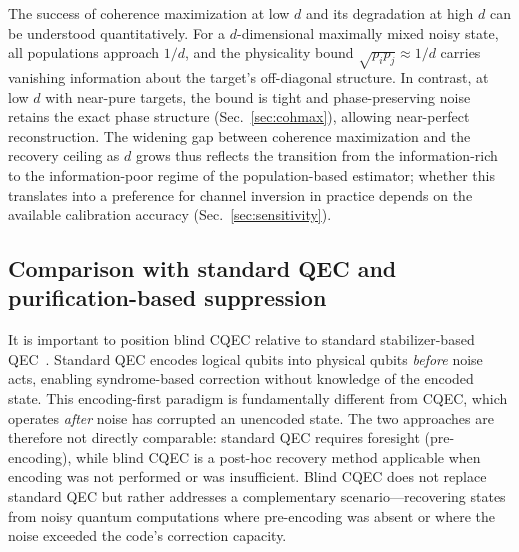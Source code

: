 \documentclass[12pt,a4paper]{article}
\begin{document}
The success of coherence maximization at low $d$ and its degradation at high $d$ can be understood quantitatively.
For a $d$-dimensional maximally mixed noisy state, all populations approach $1/d$, and the physicality bound $\sqrt{p_i p_j} \approx 1/d$ carries vanishing information about the target's off-diagonal structure.
In contrast, at low $d$ with near-pure targets, the bound is tight and phase-preserving noise retains the exact phase structure (Sec.~\ref{sec:cohmax}), allowing near-perfect reconstruction.
The widening gap between coherence maximization and the recovery ceiling as $d$ grows thus reflects the transition from the information-rich to the information-poor regime of the population-based estimator; whether this translates into a preference for channel inversion in practice depends on the available calibration accuracy (Sec.~\ref{sec:sensitivity}).


\subsection{Comparison with standard QEC and purification-based suppression}
\label{sec:pqec}

It is important to position blind CQEC relative to standard stabilizer-based QEC~\cite{Shor1995,Gottesman1997}.
Standard QEC encodes logical qubits into physical qubits \emph{before} noise acts, enabling syndrome-based correction without knowledge of the encoded state.
This encoding-first paradigm is fundamentally different from CQEC, which operates \emph{after} noise has corrupted an unencoded state.
The two approaches are therefore not directly comparable: standard QEC requires foresight (pre-encoding), while blind CQEC is a post-hoc recovery method applicable when encoding was not performed or was insufficient.
Blind CQEC does not replace standard QEC but rather addresses a complementary scenario---recovering states from noisy quantum computations where pre-encoding was absent or where the noise exceeded the code's correction capacity.
\end{document}
